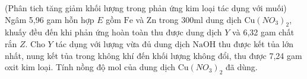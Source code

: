 \begin{vd}
	(Phân tich tăng giảm khối lượng trong phản ứng kim loại tác dụng với muối)
	Ngâm 5,96 gam hỗn hợp $E$ gồm $\mathrm{Fe}$ và $\mathrm{Zn}$ trong $300\mathrm{ml}$ dung dịch $\mathrm{Cu}\left(NO_3\right)_2$, khuấy đều đến khi phản ứng hoàn toàn thu được dung dịch $Y$ và 6,32 gam chất rắn $Z$. Cho $Y$ tác dụng với lượng vừa đủ dung dịch $\mathrm{NaOH}$ thu được kết tủa lớn nhất, nung kết tủa trong không khí đến khối lượng không đổi, thu được 7,24 gam oxit kim loại. Tính nồng độ mol của dung dịch $\mathrm{Cu}\left(NO_3\right)_2$ đã dùng.
	\loigiai{
}
\end{vd}
